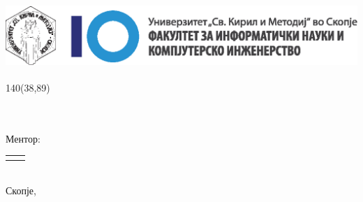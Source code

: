 \begin{titlepage}
	\begin{center}
		\includegraphics[height=2.5cm]{fcse-logo_mk}\\
		\large
		
		\vspace*{14cm}
		
		\setlength{\TPHorizModule}{1mm}
		\setlength{\TPVertModule}{\TPHorizModule}
		\newlength{\backupparindent}
		\setlength{\backupparindent}{\parindent}
		\setlength{\parindent}{0mm}			
		\begin{textblock}{140}(38,89)
			\vspace*{1mm}
			\huge
			\textbf{\doctitle \\}
			\Large
			\vspace*{5mm}
			\textit{\docsubtitle}\\
			\vspace*{10mm}
			\Large
			\me\\
		\end{textblock}
		
		Ментор:\\
		\begin{tabular}{rl}
			\firstCommitteeMember\\
		\end{tabular}
		
		\vfill
		\vfill
		
		\version \\
		\large
		Скопје, \monthYear\\
		
		\setlength{\parindent}{\backupparindent}
	\end{center}
\end{titlepage}